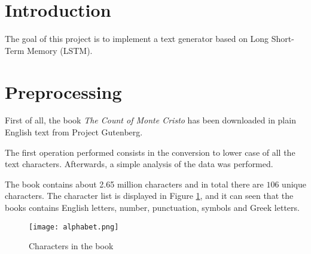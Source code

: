\documentclass[a4paper,12pt]{article} %
\begin{document}
	\thispagestyle{empty}  
	\vspace{0.4cm}

	
	\section{Introduction}
	\label{section:intro}
	The goal of this project is to implement a text generator based on Long 
	Short-Term Memory (LSTM).
	
	\section{Preprocessing}
	\label{section:preprocessing}
	First of all, the book \textit{The Count of Monte Cristo} has been  
	downloaded in plain English text from Project Gutenberg.
	
	The first operation performed consists in the conversion to lower case of 
	all the text characters. Afterwards, a simple analysis of the data was 
	performed.
	
	The book contains about 2.65 million characters and in total there are $106$ unique characters. The character list is displayed in Figure \ref{fig:alphabet}, and it can seen that the books contains English letters, number, punctuation, symbols and Greek letters.
	
	\begin{figure}[htb]
		\centering
		\texttt{[image: alphabet.png]}	
		\caption{Characters in the book}
		\label{fig:alphabet}
	\end{figure}
\end{document}
